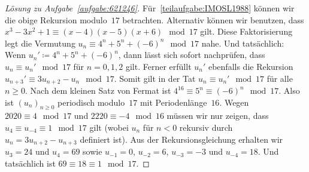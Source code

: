 \begin{proof}[Lösung zu Aufgabe~\ref{aufgabe:621246}]
	Für~\ref{teilaufgabe:IMOSL1988} können wir die obige Rekursion modulo~$17$ betrachten. Alternativ können wir benutzen, dass $x^3-3x^2+1\equiv (x-4)(x-5)(x+6)\mod 17$ gilt. Diese Faktorisierung legt die Vermutung $u_n\equiv 4^n+5^n+(-6)^n\mod 17$ nahe. Und tatsächlich: Wenn $u_n'\coloneqq 4^n+5^n+(-6)^n$, dann lässt sich sofort nachprüfen, dass $u_n\equiv u_n'\mod 17$ für $n=0,1,2$ gilt. Ferner erfüllt $u_n'$ ebenfalls die Rekursion $u_{n+3}'\equiv 3u_{n+2}-u_n\mod 17$. Somit gilt in der Tat $u_n\equiv u_n'\mod 17$ für alle $n\geqslant 0$. Nach dem kleinen Satz von Fermat ist $4^{16}\equiv 5^n\equiv (-6)^n\mod 17$. Also ist $(u_n)_{n\geqslant 0}$ periodisch modulo~$17$ mit Periodenlänge~$16$. Wegen $2020\equiv 4\mod 17$ und $2220\equiv -4\mod 16$ müssen wir nur zeigen, dass $u_4\equiv u_{-4}\equiv 1\mod 17$ gilt (wobei $u_n$ für $n<0$ rekursiv durch $u_n=3u_{n+2}-u_{n+3}$ definiert ist). Aus der Rekursionsgleichung erhalten wir $u_3=24$ und $u_4=69$ sowie $u_{-1}=0$, $u_{-2}=6$, $u_{-3}=-3$ und $u_{-4}=18$. Und tatsächlich ist $69\equiv 18\equiv 1\mod 17$.
\end{proof}

